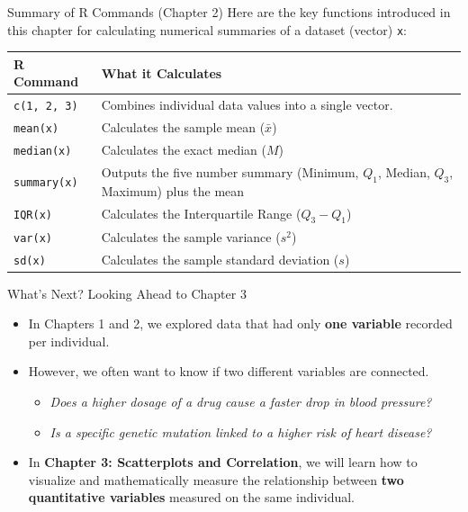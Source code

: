 \documentclass[aspectratio=169]{beamer}
\begin{document}
\begin{frame}[fragile]{Summary of R Commands (Chapter 2)} 
Here are the key functions introduced in this chapter for calculating numerical summaries of a dataset (vector) \texttt{x}:
\begin{table}
\centering
\small
\begin{tabular}{lp{8.5cm}}
\toprule
\textbf{R Command} & \textbf{What it Calculates} \\
\midrule
\texttt{c(1, 2, 3)} & Combines individual data values into a single vector. \\
\addlinespace
\texttt{mean(x)} & Calculates the sample mean ($\bar{x}$) \\
\addlinespace
\texttt{median(x)} & Calculates the exact median ($M$) \\
\addlinespace
\texttt{summary(x)} & Outputs the five number summary (Minimum, $Q_1$, Median, $Q_3$, Maximum) plus the mean \\
\addlinespace
\texttt{IQR(x)} & Calculates the Interquartile Range ($Q_3 - Q_1$) \\
 \addlinespace
\texttt{var(x)} & Calculates the sample variance ($s^2$) \\
\addlinespace
\texttt{sd(x)} & Calculates the sample standard deviation ($s$) \\
\bottomrule
\end{tabular}
\end{table}
\end{frame}

\begin{frame}{What’s Next? Looking Ahead to Chapter 3}
\begin{itemize}
	\item In Chapters 1 and 2, we explored data that had only \textbf{one variable} recorded per individual.
	\item However, we often want to know if two different variables are connected.
	\begin{itemize}
	      \item \emph{Does a higher dosage of a drug cause a faster drop in blood pressure?}
	      \item \emph{Is a specific genetic mutation linked to a higher risk of heart disease?}
	\end{itemize}
	\item In \textbf{Chapter 3: Scatterplots and Correlation}, we will learn how to visualize and mathematically measure the relationship between \textbf{two quantitative variables} measured on the same individual.
 \end{itemize}
\end{frame}
\end{document}
